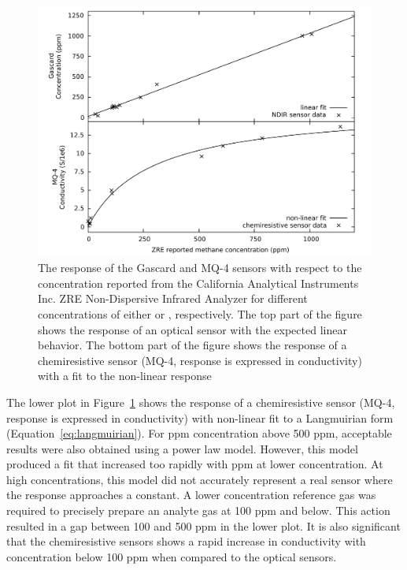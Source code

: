 \documentclass[sensors,article,submit,moreauthors,pdftex]{Definitions/mdpi}
\begin{document}
			\begin{figure}[!t]
				\centering
				\includegraphics[width=0.9\columnwidth]{honey9.pdf}
				\caption{The response of the Gascard and MQ-4 sensors with respect to the concentration reported from the California Analytical Instruments Inc. ZRE Non-Dispersive Infrared Analyzer for different concentrations of either  or , respectively.
					The top part of the figure shows the response of an optical  sensor with the expected linear behavior.
					The bottom part of the figure shows the response of a chemiresistive  sensor (MQ-4, response is expressed in conductivity) with a fit to the non-linear response}
				\label{fig:gascardcodiff}
			\end{figure}
			
			The lower plot in Figure~\ref{fig:gascardcodiff} shows the response of a chemiresistive  sensor (MQ-4, response is expressed in conductivity) with non-linear fit to a  Langmuirian form (Equation~\ref{eq:langmuirian}).
			For ppm concentration above 500 ppm, acceptable results were also obtained using a power law model.
			However, this model produced a fit that increased too rapidly with ppm at lower concentration.
			At high concentrations, this model did not accurately represent a real sensor where the response approaches a constant.
			A lower concentration reference gas was required to precisely prepare an analyte gas at 100 ppm and below.
			This action resulted in a gap between 100 and 500 ppm in the lower plot.
			It is also significant that the chemiresistive sensors shows a rapid increase in conductivity with concentration below 100 ppm when compared to the optical sensors.
			
\end{document}
